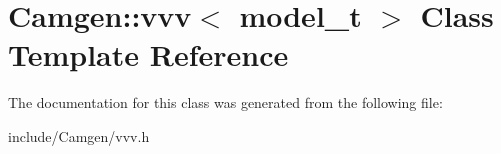\hypertarget{a00574}{\section{Camgen\-:\-:vvv$<$ model\-\_\-t $>$ Class Template Reference}
\label{a00574}
}


The documentation for this class was generated from the following file\-:\begin{DoxyCompactItemize}
\item 
include/\-Camgen/vvv.\-h\end{DoxyCompactItemize}
